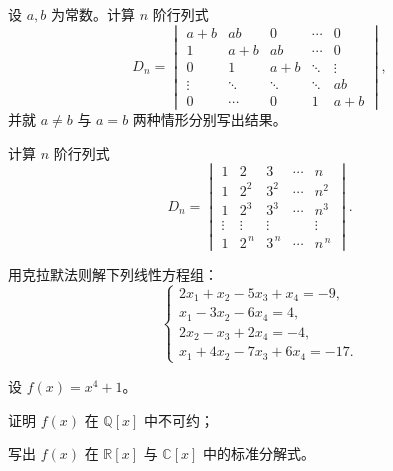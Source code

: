 \documentclass[11pt,a4paper,fontset=windows]{ctexart}
\begin{document}
\begin{qs}
\item 设 $a,b$ 为常数。计算 $n$ 阶行列式
\[
D_n=\begin{vmatrix}
a+b&ab&0&\cdots&0\\
1&a+b&ab&\cdots&0\\
0&1&a+b&\ddots&\vdots\\
\vdots&\ddots&\ddots&\ddots&ab\\
0&\cdots&0&1&a+b
\end{vmatrix},
\]
并就 $a\neq b$ 与 $a=b$ 两种情形分别写出结果。

\item 计算 $n$ 阶行列式
\[
D_n=\begin{vmatrix}
1&2&3&\cdots&n\\
1&2^{2}&3^{2}&\cdots&n^{2}\\
1&2^{3}&3^{3}&\cdots&n^{3}\\
\vdots&\vdots&\vdots&&\vdots\\
1&2^{\,n}&3^{\,n}&\cdots&n^{\,n}
\end{vmatrix}.
\]

\item 用克拉默法则解下列线性方程组：
\[
\begin{cases}
2x_1+x_2-5x_3+x_4=-9,\\[2pt]
x_1-3x_2-6x_4=4,\\[2pt]
2x_2-x_3+2x_4=-4,\\[2pt]
x_1+4x_2-7x_3+6x_4=-17.
\end{cases}
\]

\item 设 $f(x)=x^{4}+1$。
\begin{sub}
\item 证明 $f(x)$ 在 $\mathbb{Q}[x]$ 中不可约；
\item 写出 $f(x)$ 在 $\mathbb{R}[x]$ 与 $\mathbb{C}[x]$ 中的标准分解式。
\end{sub}
\end{qs}
\end{document}
